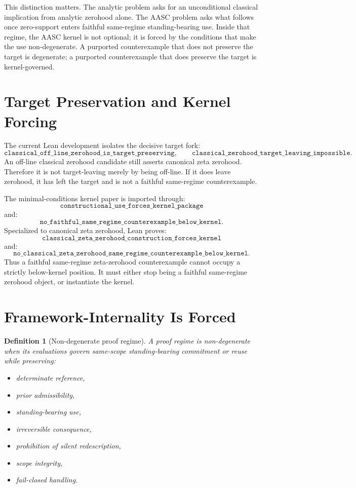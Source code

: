 \documentclass[11pt]{article}
\newtheorem{definition}{Definition}
\begin{document}
This distinction matters.  The analytic problem asks for an unconditional
classical implication from analytic zerohood alone.  The AASC problem asks
what follows once zero-support enters faithful same-regime standing-bearing
use.  Inside that regime, the AASC kernel is not optional; it is forced by the
conditions that make the use non-degenerate.  A purported counterexample that
does not preserve the target is degenerate; a purported counterexample that
does preserve the target is kernel-governed.

\section{Target Preservation and Kernel Forcing}

The current Lean development isolates the decisive target fork:
\[
\texttt{classical\_off\_line\_zerohood\_is\_target\_preserving},
\qquad
\texttt{classical\_zerohood\_target\_leaving\_impossible}.
\]
An off-line classical zerohood candidate still asserts canonical zeta
zerohood.  Therefore it is not target-leaving merely by being off-line.  If it
does leave zerohood, it has left the target and is not a faithful same-regime
counterexample.

The minimal-conditions kernel paper is imported through:
\[
\texttt{constructional\_use\_forces\_kernel\_package}
\]
and:
\[
\texttt{no\_faithful\_same\_regime\_counterexample\_below\_kernel}.
\]
Specialized to canonical zeta zerohood, Lean proves:
\[
\texttt{classical\_zeta\_zerohood\_construction\_forces\_kernel}
\]
and:
\[
\texttt{no\_classical\_zeta\_zerohood\_same\_regime\_counterexample\_below\_kernel}.
\]
Thus a faithful same-regime zeta-zerohood counterexample cannot occupy a
strictly below-kernel position.  It must either stop being a faithful
same-regime zerohood object, or instantiate the kernel.

\section{Framework-Internality Is Forced}

\begin{definition}[Non-degenerate proof regime]
A proof regime is non-degenerate when its evaluations govern same-scope
standing-bearing commitment or reuse while preserving:
\begin{itemize}
  \item determinate reference,
  \item prior admissibility,
  \item standing-bearing use,
  \item irreversible consequence,
  \item prohibition of silent redescription,
  \item scope integrity,
  \item fail-closed handling.
\end{itemize}
\end{definition}
\end{document}
